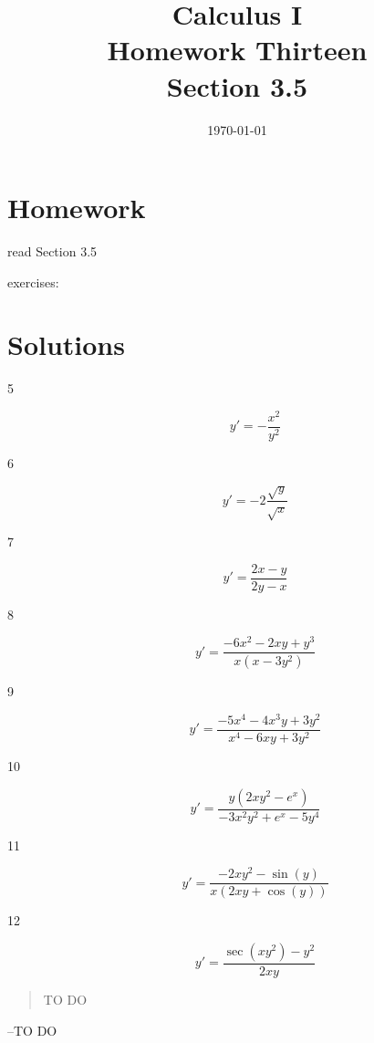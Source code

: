 \documentclass[letterpaper, landscape]{exam}
\title{Calculus I \\ Homework Thirteen \\ Section 3.5}
\author{}
\date{\today}
\begin{document}
  \maketitle

  \section{Homework}
    \begin{itemize*}
      \item read Section 3.5
      \item exercises: 
    \end{itemize*}

  \ifprintanswers

  \section{Solutions}

  \begin{description}

    \item[5] 
      \[
        y' = - \frac{x^2}{y^2} 
      \]


    \item[6] 
      \[
        y' = -2 \frac{\sqrt{y}}{\sqrt{x}} 
      \]

    \item[7] 
      \[
        y' = \frac{2x - y}{2y - x}
      \]

    \item[8] 
      \[
        y' = \frac{ - 6x^2 - 2xy + y^3}{x \left(x - 3y^2 \right)} 
      \]

    \item[9] 
      \[
        y' = \frac{-5 x^4-4 x^3 y+3 y^2}{x^4-6 x y+3 y^2}
      \]

    \item[10] 
      \[
        y' = \frac{y \left(2x y^2 - e^x\right)}{ - 3x^2 y^2 + e^x - 5 y^4}
      \]

    \item[11] 
      \[
        y' = \frac{ - 2x y^2 - \sin (y)}{x (2x y + \cos (y))}
      \]

    \item[12] 
      \[
        y' = \frac{\sec \left( x y^2 \right) - y^2 }{2x y}
      \]
  \end{description}

  \else
    \vspace{10 cm}
    \begin{quote}
      \begin{em}
        TO DO
      \end{em}
    \end{quote}
    \hspace{2 cm} --TO DO
  \fi
\end{document}
